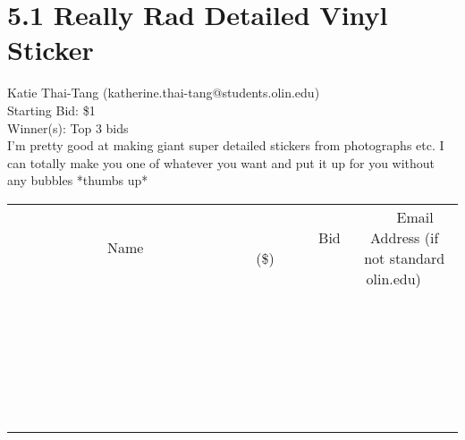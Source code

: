 \documentclass[11pt]{article}
\begin{document}
\section*{5.1 Really Rad Detailed Vinyl Sticker}
Katie Thai-Tang (katherine.thai-tang@students.olin.edu) \\
Starting Bid: \$1 \\
Winner(s): 
Top 3 bids \\
I'm pretty good at making giant super detailed stickers from photographs etc. I can totally make you one of whatever you want and put it up for you without any bubbles *thumbs up* \\[6ex]
\begin{tabular}{c c c}
~~~~~~~~~~~~~Name~~~~~~~~~~~~~ & ~~~~~~~~~Bid (\$)~~~~~~~~~ & ~~~Email Address (if not standard olin.edu)~~~ \\
 & & \\
\hline
 & & \\
\hline
 & & \\
\hline
 & & \\
\hline
 & & \\
\hline
 & & \\
\hline
 & & \\
\hline
 & & \\
\hline
 & & \\
\hline
 & & \\
\hline
 & & \\
\hline
 & & \\
\hline
 & & \\
\hline
 & & \\
\hline
 & & \\
\hline
 & & \\
\hline
 & & \\
\hline
 & & \\
\hline
 & & \\
\hline
 & & \\
\hline
 & & \\
\hline
 & & \\
\hline
 & & \\
\hline
 & & \\
\hline
 & & \\
\hline
 & & \\
\hline
\end{tabular}
\clearpage
\end{document}
